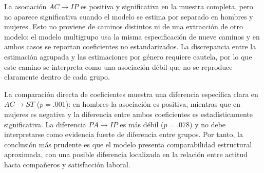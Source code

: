 \documentclass[12pt,letterpaper]{article}
\begin{document}
La asociación $AC\rightarrow IP$ es positiva y significativa en la muestra completa, pero no aparece significativa cuando el modelo se estima por separado en hombres y mujeres. Esto no proviene de caminos distintos ni de una extracción de otro modelo: el modelo multigrupo usa la misma especificación de nueve caminos y en ambos casos se reportan coeficientes no estandarizados. La discrepancia entre la estimación agrupada y las estimaciones por género requiere cautela, por lo que este camino se interpreta como una asociación débil que no se reproduce claramente dentro de cada grupo.

\begin{table}[H]
\centering
\caption{Diferencias específicas de caminos estructurales por género}
\end{table}

La comparación directa de coeficientes muestra una diferencia específica clara en $AC\rightarrow ST$ ($p=.001$): en hombres la asociación es positiva, mientras que en mujeres es negativa y la diferencia entre ambos coeficientes es estadísticamente significativa. La diferencia $PA\rightarrow IP$ es más débil ($p=.078$) y no debe interpretarse como evidencia fuerte de diferencia entre grupos. Por tanto, la conclusión más prudente es que el modelo presenta comparabilidad estructural aproximada, con una posible diferencia localizada en la relación entre actitud hacia compañeros y satisfacción laboral.
\end{document}
